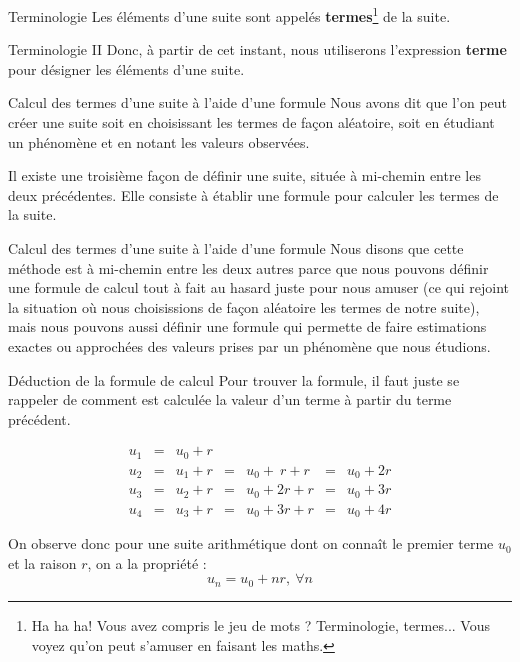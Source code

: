 \documentclass{beamer}
\begin{document}
\begin{frame}{Terminologie}
  Les éléments d'une suite sont appelés \textbf{termes}\footnote{Ha ha ha! Vous avez compris le jeu de mots ? Terminologie, termes... Vous voyez qu'on peut s'amuser en faisant les maths.} de la suite.
\end{frame}


\begin{frame}{Terminologie II}
  Donc, à partir de cet instant, nous utiliserons l'expression \textbf{terme} pour désigner les éléments d'une suite.
\end{frame}

\begin{frame}{Calcul des termes d'une suite à l'aide d'une formule}
Nous avons dit que l'on peut créer une suite soit en choisissant les termes de façon aléatoire, soit en étudiant un phénomène et en notant les valeurs observées.

Il existe une troisième façon de définir une suite, située à mi-chemin entre les deux précédentes. Elle consiste à établir une formule pour calculer les termes de la suite.
\end{frame}

\begin{frame}{Calcul des termes d'une suite à l'aide d'une formule}
  Nous disons que cette méthode est à mi-chemin entre les deux autres parce que nous pouvons définir une formule de calcul tout à fait au hasard juste pour nous amuser (ce qui rejoint la situation où nous choisissions de façon aléatoire les termes de notre suite), mais nous pouvons aussi définir une formule qui permette de faire estimations exactes ou approchées des valeurs prises par un phénomène que nous étudions.
\end{frame}


\begin{frame}{Déduction de la formule de calcul}
Pour trouver la formule, il faut juste se rappeler de comment est calculée la valeur d'un terme  à partir du terme précédent.

\begin{displaymath}
  \begin{array}{lllllll}
    u_1 & = & u_0 + r &   & 				 	    &   &					 \\
    u_2 & = & u_1 + r & = & u_0 + \ r + r & = & u_0 + 2r \\
    u_3 & = & u_2 + r & = & u_0 + 2r  + r & = & u_0 + 3r \\
    u_4 & = & u_3 + r & = & u_0 + 3r  + r & = & u_0 + 4r
  \end{array}
\end{displaymath}

On observe donc pour une suite arithmétique dont on connaît le premier terme $u_0$ et la raison $r$, on a la propriété :
\[
  u_n = u_0 + nr,\ \forall n
\]
\end{frame}
\end{document}
